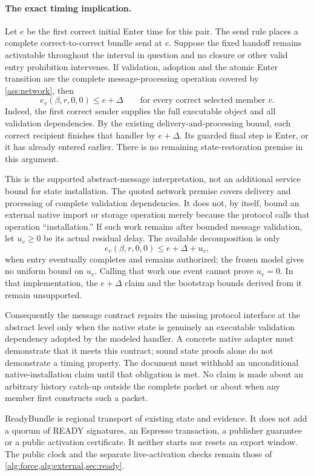 \paragraph{The exact timing implication.}
Let $e$ be the first correct initial Enter time for this pair. The send
rule places a complete correct-to-correct bundle send at $e$. Suppose the
fixed handoff remains activatable throughout the interval in question
and no closure or other valid entry prohibition intervenes.
If validation, adoption and the atomic Enter transition are the complete
message-processing operation covered by \cref{ass:network}, then
\[
 e_v(\beta,r,0,0)\le e+\Delta
 \qquad\text{for every correct selected member }v.
\]
Indeed, the first correct sender supplies the full executable object and
all validation dependencies. By the existing delivery-and-processing
bound, each correct recipient finishes that handler by $e+\Delta$.
Its guarded final step is Enter, or it has already entered earlier.
There is no remaining state-restoration premise in this argument.

This is the supported abstract-message interpretation, not an additional
service bound for state installation. The quoted network premise covers
delivery and processing of complete validation dependencies. It does not,
by itself, bound an external native import or storage operation merely
because the protocol calls that operation ``installation.'' If such work
remains after bounded message validation, let $u_v\ge0$ be its actual
residual delay. The available decomposition is only
\[
 e_v(\beta,r,0,0)\le e+\Delta+u_v,
\]
when entry eventually completes and remains authorized; the frozen model
gives no uniform bound on $u_v$. Calling that work one event cannot prove
$u_v=0$. In that implementation, the $e+\Delta$ claim and the bootstrap
bounds derived from it remain unsupported.

Consequently the message contract repairs the missing protocol interface
at the abstract level only when the native state is genuinely an executable
validation dependency adopted by the modeled handler. A concrete native
adapter must demonstrate that it meets this contract; sound state proofs
alone do not demonstrate a timing property. The document must withhold
an unconditional native-installation claim until that obligation is met.
No claim is made about an arbitrary history catch-up outside the complete
packet or about when any member first constructs such a packet.

ReadyBundle is regional transport of existing state and evidence. It does
not add a quorum of READY signatures, an Espresso transaction, a publisher
guarantee or a public activation certificate. It neither starts nor resets
an export window. The public clock and the separate live-activation checks
remain those of \cref{alg:force,alg:external,sec:ready}.
